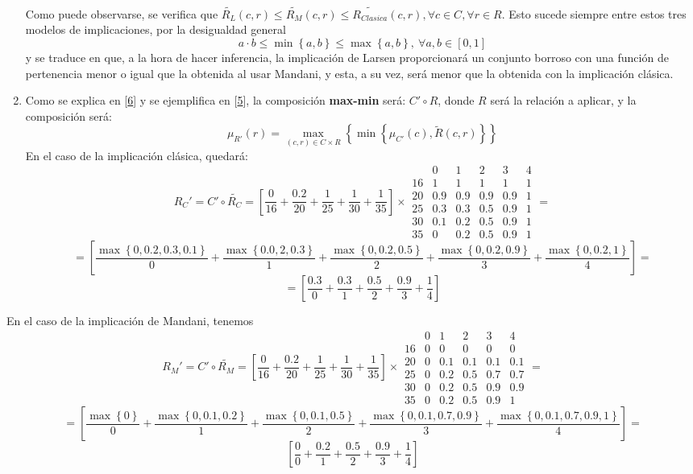 \documentclass[
]{article}
\begin{document}
\begin{enumerate}
\[\begin{array}{cccccc}
  \end{array}\] Como puede observarse, se verifica que
  \(\widetilde{R_{L}}\left(c,r\right)\leq\widetilde{R_{M}}\left(c,r\right)\leq\widetilde{R_{Clasica}}\left(c,r\right),\forall c\in C,\forall r\in R\).
  Esto sucede siempre entre estos tres modelos de implicaciones, por la
  desigualdad general
  \[a\cdot b\leq\min\left\{ a,b\right\} \leq\max\left\{ a,b\right\} ,\ \forall a,b\in\left[0,1\right]\]
  y se traduce en que, a la hora de hacer inferencia, la implicación de
  Larsen proporcionará un conjunto borroso con una función de
  pertenencia menor o igual que la obtenida al usar Mandani, y esta, a
  su vez, será menor que la obtenida con la implicación clásica.
\item
  Como se explica en {[}\protect\hyperlink{ref-PalmaInferencia}{6}{]} y
  se ejemplifica en
  {[}\protect\hyperlink{ref-BotiaPalmaImplicaciones}{5}{]}, la
  composición \textbf{max-min} será: \(C'\circ R\), donde \(R\) será la
  relación a aplicar, y la composición será:
  \[\mu_{R'}\left(r\right)=\max_{\left(c,r\right)\in C\times R}\left\{ \min\left\{ \mu_{C'}\left(c\right),\widetilde{R}\left(c,r\right)\right\} \right\} \]
  En el caso de la implicación clásica, quedará:
  \[R_C'=C'\circ\widetilde{R_{C}}=\left[\frac{0}{16}+\frac{0.2}{20}+\frac{1}{25}+\frac{1}{30}+\frac{1}{35}\right]\times\begin{array}{cccccc}
   & 0 & 1 & 2 & 3 & 4\\
  16 & 1 & 1 & 1 & 1 & 1\\
  20 & 0.9 & 0.9 & 0.9 & 0.9 & 1\\
  25 & 0.3 & 0.3 & 0.5 & 0.9 & 1\\
  30 & 0.1 & 0.2 & 0.5 & 0.9 & 1\\
  35 & 0 & 0.2 & 0.5 & 0.9 & 1
  \end{array}=\]
  \[=\left[\frac{\max\left\{ 0,0.2,0.3,0.1\right\} }{0}+\frac{\max\left\{ 0.0,2,0.3\right\} }{1}+\frac{\max\left\{ 0,0.2,0.5\right\} }{2}+\frac{\max\left\{ 0,0.2,0.9\right\} }{3}+\frac{\max\left\{ 0,0.2,1\right\} }{4}\right]=\]
  \[=\left[\frac{0.3}{0}+\frac{0.3}{1}+\frac{0.5}{2}+\frac{0.9}{3}+\frac{1}{4}\right]
  \]
\end{enumerate}

En el caso de la implicación de Mandani, tenemos
\[R_{M}'=C'\circ\widetilde{R_{M}}=\left[\frac{0}{16}+\frac{0.2}{20}+\frac{1}{25}+\frac{1}{30}+\frac{1}{35}\right]\times\begin{array}{cccccc}
 & 0 & 1 & 2 & 3 & 4\\
16 & 0 & 0 & 0 & 0 & 0\\
20 & 0 & 0.1 & 0.1 & 0.1 & 0.1\\
25 & 0 & 0.2 & 0.5 & 0.7 & 0.7\\
30 & 0 & 0.2 & 0.5 & 0.9 & 0.9\\
35 & 0 & 0.2 & 0.5 & 0.9 & 1
\end{array}=\]
\[=\left[\frac{\max\left\{ 0\right\} }{0}+\frac{\max\left\{ 0,0.1,0.2\right\} }{1}+\frac{\max\left\{ 0,0.1,0.5\right\} }{2}+\frac{\max\left\{ 0,0.1,0.7,0.9\right\} }{3}+\frac{\max\left\{ 0,0.1,0.7,0.9,1\right\} }{4}\right]=\]
\[\left[\frac{0}{0}+\frac{0.2}{1}+\frac{0.5}{2}+\frac{0.9}{3}+\frac{1}{4}\right]\]
\end{document}
